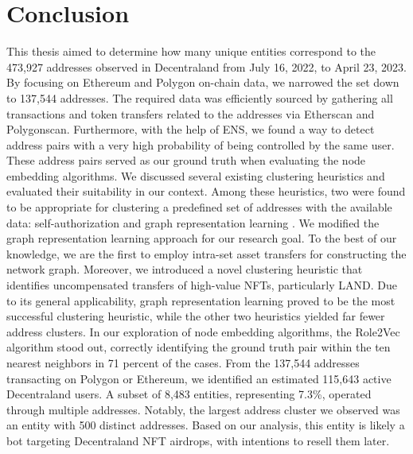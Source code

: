 \documentclass[12pt,a4paper,titlepage,oneside,english]{article}
\begin{document}
\section{Conclusion}
This thesis aimed to determine how many unique entities correspond to the 473,927 addresses observed in Decentraland from July 16, 2022, to April 23, 2023. \newline
By focusing on Ethereum and Polygon on-chain data, we narrowed the set down to 137,544 addresses. The required data was efficiently sourced by gathering all transactions and token transfers related to the addresses via Etherscan and Polygonscan. Furthermore, with the help of ENS, we found a way to detect address pairs with a very high probability of being controlled by the same user. These address pairs served as our ground truth when evaluating the node embedding algorithms. \newline
We discussed several existing clustering heuristics and evaluated their suitability in our context. Among these heuristics, two were found to be appropriate for clustering a predefined set of addresses with the available data: self-authorization \citep{FV:17} and graph representation learning \citep{Beres2020}. We modified the graph representation learning approach for our research goal. %
To the best of our knowledge, we are the first to employ intra-set asset transfers for constructing the network graph. Moreover, we introduced a novel clustering heuristic that identifies uncompensated transfers of high-value NFTs, particularly LAND. \newline
Due to its general applicability, graph representation learning proved to be the most successful clustering heuristic, while the other two heuristics yielded far fewer address clusters. In our exploration of node embedding algorithms, the Role2Vec algorithm stood out, correctly identifying the ground truth pair within the ten nearest neighbors in 71 percent of the cases. \newline
From the 137,544 addresses transacting on Polygon or Ethereum, we identified an estimated 115,643 active Decentraland users. A subset of 8,483 entities, representing 7.3\%, operated through multiple addresses. Notably, the largest address cluster we observed was an entity with 500 distinct addresses. Based on our analysis, this entity is likely a bot targeting Decentraland NFT airdrops, with intentions to resell them later. \newline
\end{document}
